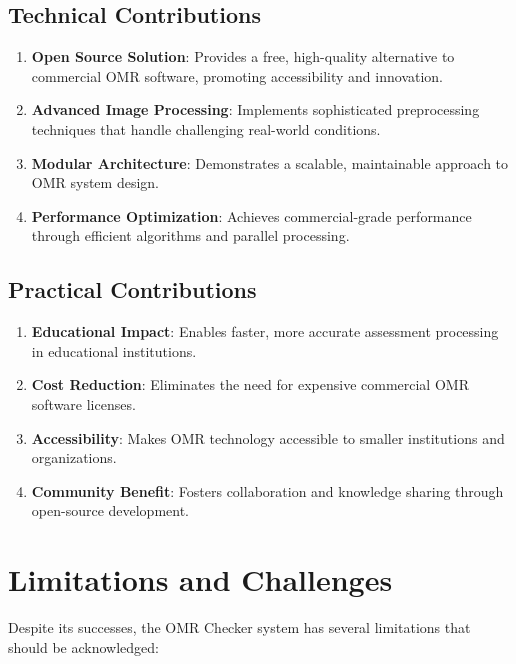 \subsection{Technical Contributions}

\begin{enumerate}
\item \textbf{Open Source Solution}: Provides a free, high-quality alternative to commercial OMR software, promoting accessibility and innovation.

\item \textbf{Advanced Image Processing}: Implements sophisticated preprocessing techniques that handle challenging real-world conditions.

\item \textbf{Modular Architecture}: Demonstrates a scalable, maintainable approach to OMR system design.

\item \textbf{Performance Optimization}: Achieves commercial-grade performance through efficient algorithms and parallel processing.
\end{enumerate}

\subsection{Practical Contributions}

\begin{enumerate}
\item \textbf{Educational Impact}: Enables faster, more accurate assessment processing in educational institutions.

\item \textbf{Cost Reduction}: Eliminates the need for expensive commercial OMR software licenses.

\item \textbf{Accessibility}: Makes OMR technology accessible to smaller institutions and organizations.

\item \textbf{Community Benefit}: Fosters collaboration and knowledge sharing through open-source development.
\end{enumerate}

\section{Limitations and Challenges}

Despite its successes, the OMR Checker system has several limitations that should be acknowledged:

